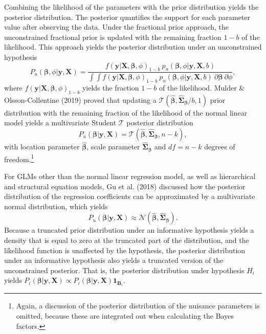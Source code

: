 \documentclass[
]{interact}
\begin{document}
Combining the likelihood of the parameters with the prior distribution
yields the posterior distribution. The posterior quantifies the support
for each parameter value after observing the data. Under the fractional
prior approach, the unconstrained fractional prior is updated with the
remaining fraction \(1-b\) of the likelihood. This approach yields the
posterior distribution under an unconstrained hypothesis \[
P_u(\boldsymbol{\beta}, \phi | \boldsymbol{y}, \boldsymbol{X}) = 
\frac{
f(\boldsymbol{y} | \boldsymbol{X}, \boldsymbol{\beta}, \phi)_{1-b} ~ p_u(\boldsymbol{\beta}, \phi | \boldsymbol{y}, \boldsymbol{X}, b)
}{
\int \int f(\boldsymbol{y} | \boldsymbol{X}, \boldsymbol{\beta}, \phi)_{1-b} ~ p_u(\boldsymbol{\beta}, \phi | \boldsymbol{y}, \boldsymbol{X}, b) ~ \partial \boldsymbol{\beta} ~ \partial \phi
},
\] where
\(f(\boldsymbol{y} | \boldsymbol{X}, \boldsymbol{\beta}, \phi)_{1-b}\)
yields the fraction \(1-b\) of the likelihood. Mulder \&
Olsson-Collentine (2019) proved that updating a
\(\mathcal{T}(\boldsymbol{\hat{\beta}}, \boldsymbol{\hat{\Sigma}_\beta} / b, 1)\)
prior distribution with the remaining fraction of the likelihood of the
normal linear model yields a multivariate Student \(\mathcal{T}\)
posterior distribution \[
P_u(\boldsymbol{\beta} | \boldsymbol{y}, \boldsymbol{X}) = \mathcal{T}(\boldsymbol{\hat{\beta}}, \boldsymbol{\hat{\Sigma}_\beta}, n - k),
\] with location parameter \(\boldsymbol{\hat{\beta}}\), scale parameter
\(\boldsymbol{\hat{\Sigma}_{\beta}}\) and \(df = n - k\) degrees of
freedom.\footnote{Again, a discussion of the posterior distribution of
  the nuisance parameters is omitted, because these are integrated out
  when calculating the Bayes factors.}

For GLMs other than the normal linear regression model, as well as
hierarchical and structural equation models, Gu et al. (2018) discussed
how the posterior distribution of the regression coefficients can be
approximated by a multivariate normal distribution, which yields \[
P_u(\boldsymbol{\beta} | \boldsymbol{y}, \boldsymbol{X}) \approx \mathcal{N}(\boldsymbol{\hat{\beta}}, \boldsymbol{\hat{\Sigma}_\beta}).
\] Because a truncated prior distribution under an informative
hypothesis yields a density that is equal to zero at the truncated part
of the distribution, and the likelihood function is unaffected by the
hypothesis, the posterior distribution under an informative hypothesis
also yields a truncated version of the unconstrained posterior. That is,
the posterior distribution under hypothesis \(H_i\) yields
\(P_i(\boldsymbol{\beta} | \boldsymbol{y}, \boldsymbol{X}) \propto P_i(\boldsymbol{\beta} | \boldsymbol{y}, \boldsymbol{X})\boldsymbol{1}_{\boldsymbol{B}_i}\).
\end{document}
